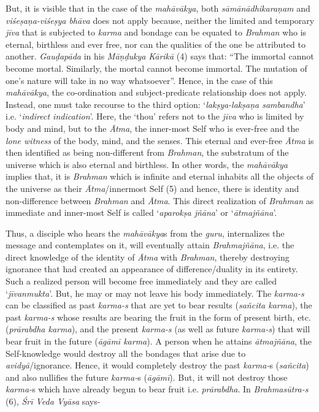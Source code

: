 But, it is visible that in the case of the \emph{mahāvākya}, both \emph{sāmānādhikaraṇam} and \emph{viśeṣaṇa-viśeṣya bhāva} does not apply because, neither the limited and temporary \emph{jīva} that is subjected to \emph{karma} and bondage can be equated to \emph{Brahman} who is eternal, birthless and ever free, nor can the qualities of the one be attributed to another. \emph{Gauḍapāda} in his \emph{Māṇḍukya} \emph{Kārikā} (4) says that: ``The immortal cannot become mortal. Similarly, the mortal cannot become immortal. The mutation of one's nature will take in no way whatsoever''. Hence, in the case of this \emph{mahāvākya}, the co-ordination and subject-predicate relationship does not apply. Instead, one must take recourse to the third option: `\emph{lakṣya-lakṣaṇa sambandha}' i.e. `\emph{indirect indication}'. Here, the `thou' refers not to the \emph{jīva} who is limited by body and mind, but to the \emph{Ātma}, the inner-most Self who is ever-free and the \emph{lone witness} of the body, mind, and the senses. This eternal and ever-free \emph{Ātma} is then identified as being non-different from \emph{Brahman}, the substratum of the universe which is also eternal and birthless. In other words, the \emph{mahāvākya} implies that, it is \emph{Brahman} which is infinite and eternal inhabits all the objects of the universe as their \emph{Ātma}/innermost Self (5) and hence, there is identity and non-difference between \emph{Brahman} and \emph{Ātma}. This direct realization of \emph{Brahman} as immediate and inner-most Self is called `\emph{aparokṣa jñāna}' or `\emph{ātmajñāna}'.

Thus, a disciple who hears the \emph{mahāvākya}s from the \emph{guru}, internalizes the message and contemplates on it, will eventually attain \emph{Brahmajñāna}, i.e. the direct knowledge of the identity of \emph{Ātma} with \emph{Brahman}, thereby destroying ignorance that had created an appearance of difference/duality in its entirety. Such a realized person will become free immediately and they are called `\emph{jīvanmukta}'. But, he may or may not leave his body immediately. The \emph{karma-s} can be classified as past \emph{karma-s} that are yet to bear results (\emph{sañcita karma}), the past \emph{karma-s} whose results are bearing the fruit in the form of present birth, etc. (\emph{prārabdha karma}), and the present \emph{karma-s} (as well as future \emph{karma-s}) that will bear fruit in the future (\emph{āgāmī karma}). A person when he attains \emph{ātmajñāna}, the Self-knowledge would destroy all the bondages that arise due to \emph{avidyā}/ignorance. Hence, it would completely destroy the past \emph{karma-}s (\emph{sañcita}) and also nullifies the future \emph{karma-}s (\emph{āgāmī}). But, it will not destroy those \emph{karma-}s which have already begun to bear fruit i.e. \emph{prārabdha}. In \emph{Brahmasūtra-s} (6), \emph{Śrī Veda Vyāsa} says-


